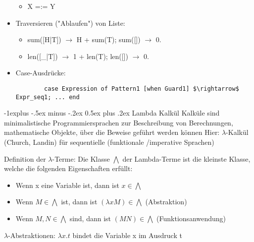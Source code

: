 \documentclass[10pt]{article}
\makeatletter
\renewcommand{\subsection}{\@startsection{subsection}{2}{0mm}%
                                {-1explus -.5ex minus -.2ex}%
                                {0.5ex plus .2ex}%
                                {\normalfont\normalsize\bfseries}}
\makeatother
\begin{document}
\begin{itemize}
\begin{itemize}
          \item X =:= Y %
        \end{itemize}
  \item Traversieren ("Ablaufen") von Liste:
        \begin{itemize}
          \item sum([H|T]) $\rightarrow$ H + sum(T); sum([]) $\rightarrow$ 0.
          \item len([\_|T]) $\rightarrow$ 1 + len(T); len([]) $\rightarrow$ 0.
        \end{itemize}
  \item Case-Ausdrücke:
        \begin{lstlisting} 
        case Expression of Pattern1 [when Guard1] $\rightarrow$ Expr_seq1; ... end 
    \end{lstlisting}
\end{itemize}


\subsection{Lambda Kalkül}
Kalküle sind minimalistische Programmiersprachen zur Beschreibung von Berechnungen, mathematische Objekte, über die Beweise geführt werden können
Hier: $\lambda$-Kalkül (Church, Landin) für sequentielle (funktionale /imperative Sprachen)

Definition der $\lambda$-Terme:
Die Klasse $\bigwedge$ der Lambda-Terme ist die kleinste Klasse, welche die folgenden Eigenschaften erfüllt:
\begin{itemize}
  \item Wenn x eine Variable ist, dann ist $x \in \bigwedge$
  \item Wenn $M \in \bigwedge$ ist, dann ist $(\lambda xM) \in \bigwedge$ (Abstraktion)
  \item Wenn $M, N \in \bigwedge$ sind, dann ist $(MN) \in \bigwedge$ (Funktionsanwendung)
\end{itemize}


$\lambda$-Abstraktionen: $\lambda x. t$ bindet die Variable x im Ausdruck t
\end{document}
